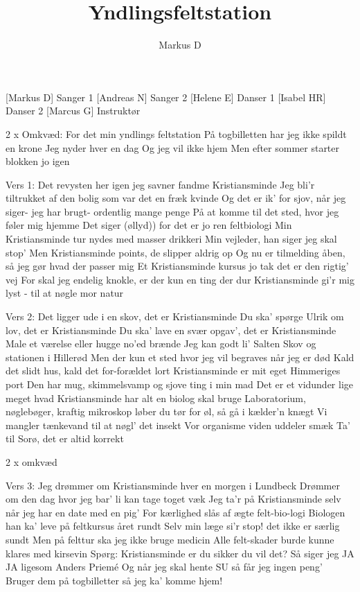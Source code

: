 \documentclass[a4paper,11pt]{article}
\title{Yndlingsfeltstation}
\author{Markus D}
\begin{document}
\maketitle

\begin{roles}
[Markus D] Sanger 1
[Andreas N] Sanger 2
[Helene E] Danser 1
[Isabel HR] Danser 2
[Marcus G] Instruktør
\end{roles}

\begin{song}


  2 x Omkvæd:
For det min yndlings feltstation
På togbilletten har jeg ikke spildt en krone
Jeg nyder hver en dag
Og jeg vil ikke hjem
Men efter sommer
starter blokken jo igen

Vers 1:
Det revysten her igen
jeg savner fandme Kristiansminde
Jeg bli'r tiltrukket af den bolig
som var det en fræk kvinde
Og det er ik’ for sjov, når jeg siger-
jeg har brugt- ordentlig mange penge
På at komme til det sted, hvor jeg føler mig hjemme
Det siger (øllyd)) for det er jo ren feltbiologi
Min Kristiansminde tur nydes med masser drikkeri
Min vejleder, han siger jeg skal stop'
Men Kristiansminde points, de slipper aldrig op
Og nu er tilmelding åben, så jeg gør hvad der passer mig
Et Kristiansminde kursus jo tak det er den rigtig' vej
For skal jeg endelig knokle, er der kun en ting der dur
Kristiansminde gi'r mig lyst - til at nøgle mor natur
	
Vers 2:
Det ligger ude i en skov, det er Kristiansminde
Du ska' spørge Ulrik om lov, det er Kristiansminde
Du ska' lave en svær opgav', det er Kristiansminde
Male et værelse eller hugge no'ed brænde
Jeg kan godt li' Salten Skov og stationen i Hillerød
Men der kun et sted hvor jeg vil begraves når jeg er død
Kald det slidt hus, kald det for-forældet lort
Kristiansminde er mit eget Himmeriges port
Den har mug, skimmelsvamp og sjove ting i min mad
Det er et vidunder  lige meget hvad
Kristiansminde har alt en biolog skal bruge
Laboratorium, nøglebøger, kraftig mikroskop
løber du tør for øl, så gå i kælder'n knægt
Vi mangler tænkevand til at nøgl' det insekt
Vor organisme viden uddeler smæk
Ta' til Sorø, det er altid korrekt

2 x omkvæd

Vers 3:
Jeg drømmer om Kristiansminde hver en morgen i Lundbeck
Drømmer om den dag hvor jeg bar' li kan tage toget væk
Jeg ta'r på Kristiansminde selv når jeg har en date med en pig'
For kærlighed slås af ægte felt-bio-logi
Biologen han ka' leve på feltkursus året rundt
Selv min læge si'r stop! det ikke er særlig sundt
Men på felttur ska jeg ikke bruge medicin
Alle felt-skader burde kunne klares med kirsevin
Spørg: Kristiansminde er du sikker du vil det?
Så siger jeg JA JA ligesom Anders Priemé
Og når jeg skal hente SU så får jeg ingen peng'
Bruger dem på togbilletter så jeg ka' komme hjem!


\end{song}
\end{document}
